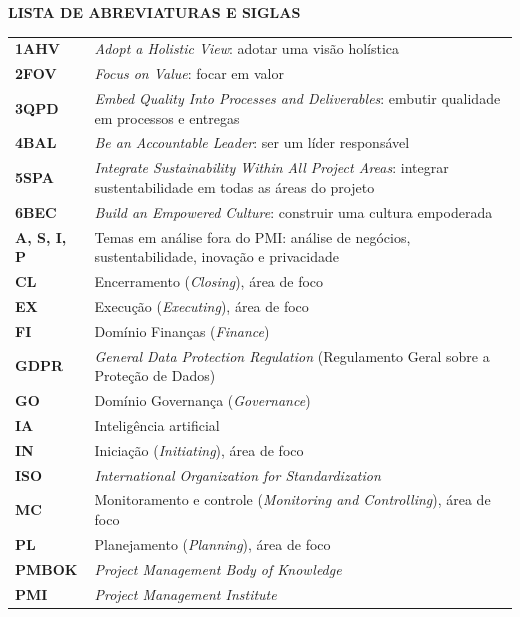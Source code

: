 \documentclass[12pt,a4paper,article,oneside,english,brazil]{abntex2}
\begin{document}
\begingroup
\SingleSpacing
\begin{center}\textbf{LISTA DE ABREVIATURAS E SIGLAS}\end{center}
\small
\begin{longtable}{@{}>{\raggedright\arraybackslash}p{2.6cm}>{\raggedright\arraybackslash}p{\dimexpr\linewidth-2.6cm-2\tabcolsep\relax}@{}}
\textbf{1AHV} & \textit{Adopt a Holistic View}: adotar uma visão holística\\[2pt]
\textbf{2FOV} & \textit{Focus on Value}: focar em valor\\[2pt]
\textbf{3QPD} & \textit{Embed Quality Into Processes and Deliverables}: embutir qualidade em processos e entregas\\[2pt]
\textbf{4BAL} & \textit{Be an Accountable Leader}: ser um líder responsável\\[2pt]
\textbf{5SPA} & \textit{Integrate Sustainability Within All Project Areas}: integrar sustentabilidade em todas as áreas do projeto\\[2pt]
\textbf{6BEC} & \textit{Build an Empowered Culture}: construir uma cultura empoderada\\[2pt]
\textbf{A, S, I, P} & Temas em análise fora do PMI: análise de negócios, sustentabilidade, inovação e privacidade\\[2pt]
\textbf{CL} & Encerramento (\textit{Closing}), área de foco\\[2pt]
\textbf{EX} & Execução (\textit{Executing}), área de foco\\[2pt]
\textbf{FI} & Domínio Finanças (\textit{Finance})\\[2pt]
\textbf{GDPR} & \textit{General Data Protection Regulation} (Regulamento Geral sobre a Proteção de Dados)\\[2pt]
\textbf{GO} & Domínio Governança (\textit{Governance})\\[2pt]
\textbf{IA} & Inteligência artificial\\[2pt]
\textbf{IN} & Iniciação (\textit{Initiating}), área de foco\\[2pt]
\textbf{ISO} & \textit{International Organization for Standardization}\\[2pt]
\textbf{MC} & Monitoramento e controle (\textit{Monitoring and Controlling}), área de foco\\[2pt]
\textbf{PL} & Planejamento (\textit{Planning}), área de foco\\[2pt]
\textbf{PMBOK} & \textit{Project Management Body of Knowledge}\\[2pt]
\textbf{PMI} & \textit{Project Management Institute}\\[2pt]

\end{longtable}
\end{document}
